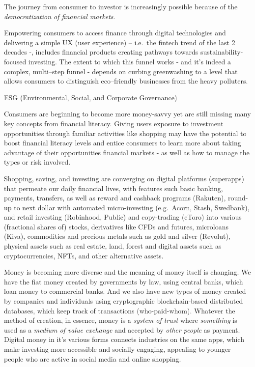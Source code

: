 \documentclass[
  letterpaper,
  DIV=11,
  numbers=noendperiod]{scrartcl}
\begin{document}
The journey from consumer to investor is increasingly possible because
of the \emph{democratization of financial markets}.

Empowering consumers to access finance through digital technologies and
delivering a simple UX (user experience) -- i.e.~the fintech trend of
the last 2 decades -, includes financial products creating pathways
towards sustainability-focused investing. The extent to which this
funnel works - and it's indeed a complex, multi--step funnel - depends
on curbing greenwashing to a level that allows consumers to distinguish
eco--friendly businesses from the heavy polluters.

ESG (Environmental, Social, and Corporate Governance)

Consumers are beginning to become more money-savvy yet are still missing
many key concepts from financial literacy. Giving users exposure to
investment opportunities through familiar activities like shopping may
have the potential to boost financial literacy levels and entice
consumers to learn more about taking advantage of their opportunities
financial markets - as well as how to manage the types or risk involved.

Shopping, saving, and investing are converging on digital platforms
(superapps) that permeate our daily financial lives, with features such
basic banking, payments, transfers, as well as reward and cashback
programs (Rakuten), round-up to next dollar with automated
micro-investing (e.g.~Acorn, Stash, Swedbank), and retail investing
(Robinhood, Public) and copy-trading (eToro) into various (fractional
shares of) stocks, derivatives like CFDs and futures, microloans (Kiva),
commodities and precious metals such as gold and silver (Revolut),
physical assets such as real estate, land, forest and digital assets
such as cryptocurrencies, NFTs, and other alternative assets.

Money is becoming more diverse and the meaning of money itself is
changing. We have the fiat money created by governments by law, using
central banks, which loan money to commercial banks. And we also have
new types of money created by companies and individuals using
cryptographic blockchain-based distributed databases, which keep track
of transactions (who-paid-whom). Whatever the method of creation, in
essence, money is a \emph{system of trust} where \emph{something} is
used as a \emph{medium of value exchange} and accepted by \emph{other
people} as payment. Digital money in it's various forms connects
industries on the same apps, which make investing more accessible and
socially engaging, appealing to younger people who are active in social
media and online shopping.
\end{document}
